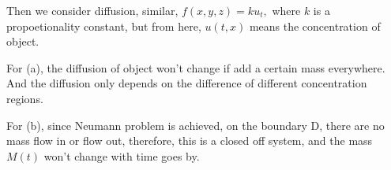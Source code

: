 \documentclass{article}
\begin{document}
		Then we consider diffusion, similar, $f(x,y,z)=ku_{t},$ where $k$ is a propoetionality constant, but from here, $u(t,x)$ means the concentration of object.
		
		For (a), the diffusion of object won't change if add a certain mass everywhere. And the diffusion only depends on the difference of different concentration regions.

		For (b), since Neumann problem is achieved, on the boundary D, there are no mass flow in or flow out, therefore, this is a closed off system, and the mass $M(t)$ won't change with time goes by.  
\end{document}
